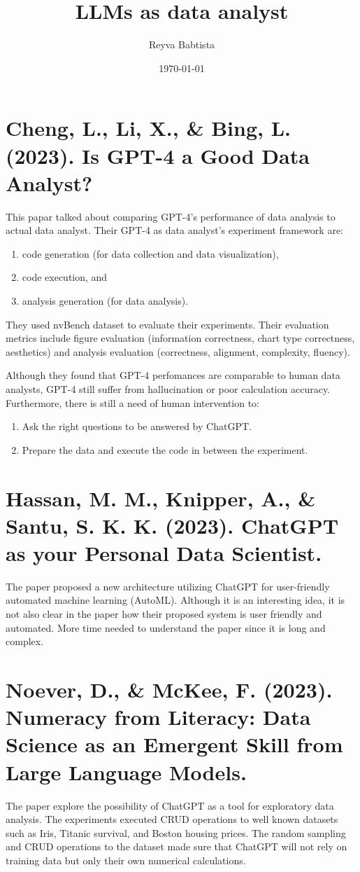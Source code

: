 \documentclass[11pt]{article}
\author{Reyva Babtista}
\date{\today}
\title{LLMs as data analyst}
\begin{document}
\maketitle

\section{Cheng, L., Li, X., \& Bing, L. (2023). Is GPT-4 a Good Data Analyst?}
\label{sec:orgdaaa6df}
This papar talked about comparing GPT-4's
performance of data analysis to actual data analyst. Their GPT-4 as data
analyst's experiment framework are:
\begin{enumerate}
\item code generation (for data collection and data visualization),
\item code execution, and
\item analysis generation (for data analysis).
\end{enumerate}
They used nvBench dataset to evaluate their experiments. Their evaluation
metrics include figure evaluation (information correctness, chart type
correctness, aesthetics) and analysis evaluation (correctness, alignment,
complexity, fluency).

Although they found that GPT-4 perfomances are comparable to human data
analysts, GPT-4 still suffer from hallucination or poor calculation accuracy.
Furthermore, there is still a need of human intervention to:
\begin{enumerate}
\item Ask the right questions to be answered by ChatGPT.
\item Prepare the data and execute the code in between the experiment.
\end{enumerate}

\section{Hassan, M. M., Knipper, A., \& Santu, S. K. K. (2023). ChatGPT as your Personal Data Scientist.}
\label{sec:org7a69432}
The paper proposed a new architecture utilizing ChatGPT for user-friendly
automated machine learning (AutoML). Although it is an interesting idea, it is
not also clear in the paper how their proposed system is user friendly and
automated. More time needed to understand the paper since it is long and
complex.

\section{Noever, D., \& McKee, F. (2023). Numeracy from Literacy: Data Science as an Emergent Skill from Large Language Models.}
\label{sec:org64dc2ad}
The paper explore the possibility of ChatGPT as a tool for exploratory data
analysis. The experiments executed CRUD operations to well known datasets such
as Iris, Titanic survival, and Boston housing prices. The random sampling and
CRUD operations to the dataset made sure that ChatGPT will not rely on training
data but only their own numerical calculations.
\end{document}
